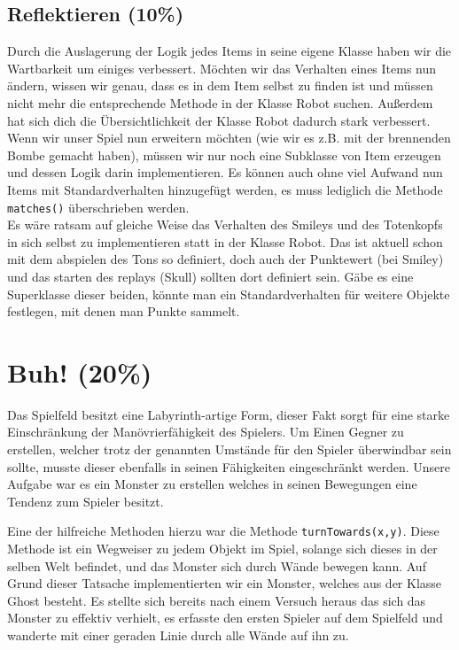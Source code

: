 \documentclass{pi1}
\begin{document}
\subsection{Reflektieren (10\%)}

Durch die Auslagerung der Logik jedes Items in seine eigene Klasse haben wir die Wartbarkeit um einiges verbessert. Möchten wir das Verhalten eines Items nun ändern, wissen wir genau, dass es in dem Item selbst zu finden ist und müssen nicht mehr die entsprechende Methode in der Klasse Robot suchen. Außerdem hat sich dich die Übersichtlichkeit der Klasse Robot dadurch stark verbessert.\\
Wenn wir unser Spiel nun erweitern möchten (wie wir es z.B. mit der brennenden Bombe gemacht haben), müssen wir nur noch eine Subklasse von Item erzeugen und dessen Logik darin implementieren. Es können auch ohne viel Aufwand nun Items mit Standardverhalten hinzugefügt werden, es muss lediglich die Methode \texttt{matches()} überschrieben werden.\\
Es wäre ratsam auf gleiche Weise das Verhalten des Smileys und des Totenkopfs in sich selbst zu implementieren statt in der Klasse Robot. Das ist aktuell schon mit dem abspielen des Tons so definiert, doch auch der Punktewert (bei Smiley) und das starten des replays (Skull) sollten dort definiert sein. Gäbe es eine Superklasse dieser beiden, könnte man ein Standardverhalten für weitere Objekte festlegen, mit denen man Punkte sammelt.

\section{Buh! (20\%)}
Das Spielfeld besitzt eine Labyrinth-artige Form, dieser Fakt sorgt für eine starke Einschränkung der Manövrierfähigkeit des Spielers.
Um Einen Gegner zu erstellen, welcher trotz der genannten Umstände für den Spieler überwindbar sein sollte, musste dieser ebenfalls in seinen Fähigkeiten eingeschränkt werden.\newline
Unsere Aufgabe war es ein Monster zu erstellen welches in seinen Bewegungen eine Tendenz zum Spieler besitzt.

Eine der hilfreiche Methoden hierzu war die Methode \texttt{turnTowards(x,y)}. Diese Methode ist ein Wegweiser zu jedem Objekt im Spiel, solange sich dieses in der selben Welt befindet, und das Monster sich durch Wände bewegen kann.
Auf Grund dieser Tatsache implementierten wir ein Monster, welches aus der Klasse Ghost besteht.\newline
Es stellte sich bereits nach einem Versuch heraus das sich das Monster zu effektiv verhielt, es erfasste den ersten Spieler auf dem Spielfeld und wanderte mit einer geraden Linie durch alle Wände auf ihn zu.
\end{document}
